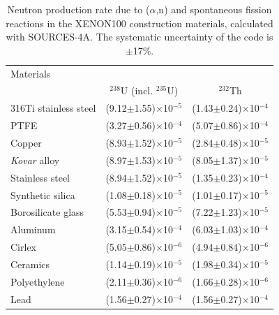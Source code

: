 \begin{table}[!t]
\centering
\caption[Neutron production rate due to ($\alpha$,n) and spontaneous fission reactions in the XENON100 construction materials, calculated with SOURCES-4A]{Neutron production rate due to ($\alpha$,n) and spontaneous fission reactions in the XENON100 construction materials, calculated with SOURCES-4A. The systematic uncertainty of the code is $\pm$17\%.}
\label{tabNeutronProductionMaterials}
\begin{tabular}{>{\footnotesize}l|>{\footnotesize}c|>{\footnotesize}c}
\hline
Materials 							& \multicolumn{2}{>{\footnotesize}c}{Neutron production [n$\cdot$kg$^{-1}\cdot$s$^{-1}$] for	1~Bq/kg of}	  \\
								&  $^{238}$U (incl. $^{235}$U) 			&  $^{232}$Th	  \\
\hline
316Ti stainless steel					&  (9.12$\pm$1.55)$\times$10$^{-5}$		& (1.43$\pm$0.24)$\times$10$^{-4}$ \\
PTFE							&  (3.27$\pm$0.56)$\times$10$^{-4}$		& (5.07$\pm$0.86)$\times$10$^{-4}$ \\
Copper							&  (8.93$\pm$1.52)$\times$10$^{-5}$		& (2.84$\pm$0.48)$\times$10$^{-5}$ \\
{\it Kovar} alloy						&  (8.97$\pm$1.53)$\times$10$^{-5}$		& (8.05$\pm$1.37)$\times$10$^{-5}$ \\
Stainless steel						&  (8.94$\pm$1.52)$\times$10$^{-5}$		& (1.35$\pm$0.23)$\times$10$^{-4}$ \\
Synthetic silica						&  (1.08$\pm$0.18)$\times$10$^{-5}$		& (1.01$\pm$0.17)$\times$10$^{-5}$ \\
Borosilicate glass					&  (5.53$\pm$0.94)$\times$10$^{-5}$		& (7.22$\pm$1.23)$\times$10$^{-5}$ \\
Aluminum 						&  (3.15$\pm$0.54)$\times$10$^{-4}$		& (6.03$\pm$1.03)$\times$10$^{-4}$ \\
Cirlex							&  (5.05$\pm$0.86)$\times$10$^{-6}$	 	& (4.94$\pm$0.84)$\times$10$^{-6}$ \\
Ceramics							&  (1.14$\pm$0.19)$\times$10$^{-5}$		& (1.98$\pm$0.34)$\times$10$^{-5}$ \\
Polyethylene						&  (2.11$\pm$0.36)$\times$10$^{-6}$		& (1.66$\pm$0.28)$\times$10$^{-6}$ \\
Lead								&  (1.56$\pm$0.27)$\times$10$^{-4}$		& (1.56$\pm$0.27)$\times$10$^{-4}$ \\
\hline
\end{tabular}
\end{table}

